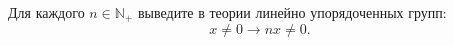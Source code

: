 Для каждого $n \in \mathbb{N}_+$ выведите в теории линейно упорядоченных групп:
$$
    x \neq 0 \longrightarrow nx \neq 0.
$$